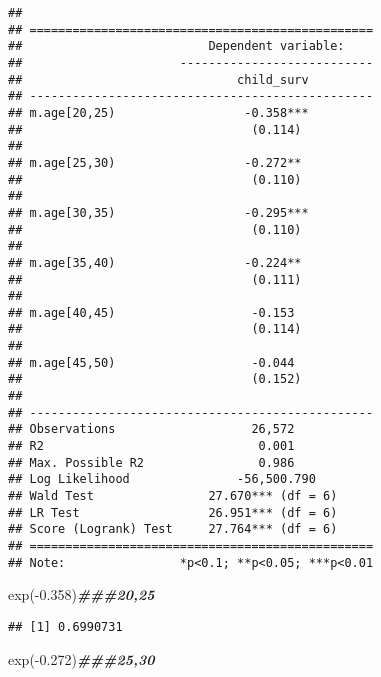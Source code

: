 \documentclass[
]{article}
\newenvironment{Shaded}{\begin{snugshade}}{\end{snugshade}}
\newcommand{\DocumentationTok}[1]{\textcolor[rgb]{0.56,0.35,0.01}{\textbf{\textit{#1}}}}
\newcommand{\FloatTok}[1]{\textcolor[rgb]{0.00,0.00,0.81}{#1}}
\newcommand{\FunctionTok}[1]{\textcolor[rgb]{0.00,0.00,0.00}{#1}}
\newcommand{\NormalTok}[1]{#1}
\newcommand{\SpecialCharTok}[1]{\textcolor[rgb]{0.00,0.00,0.00}{#1}}
\begin{document}
\begin{verbatim}
## 
## ================================================
##                          Dependent variable:    
##                      ---------------------------
##                              child_surv         
## ------------------------------------------------
## m.age[20,25)                  -0.358***         
##                                (0.114)          
##                                                 
## m.age[25,30)                  -0.272**          
##                                (0.110)          
##                                                 
## m.age[30,35)                  -0.295***         
##                                (0.110)          
##                                                 
## m.age[35,40)                  -0.224**          
##                                (0.111)          
##                                                 
## m.age[40,45)                   -0.153           
##                                (0.114)          
##                                                 
## m.age[45,50)                   -0.044           
##                                (0.152)          
##                                                 
## ------------------------------------------------
## Observations                   26,572           
## R2                              0.001           
## Max. Possible R2                0.986           
## Log Likelihood               -56,500.790        
## Wald Test                27.670*** (df = 6)     
## LR Test                  26.951*** (df = 6)     
## Score (Logrank) Test     27.764*** (df = 6)     
## ================================================
## Note:                *p<0.1; **p<0.05; ***p<0.01
\end{verbatim}

\begin{Shaded}
\begin{Highlighting}[]
\FunctionTok{exp}\NormalTok{(}\SpecialCharTok{{-}}\FloatTok{0.358}\NormalTok{)}\DocumentationTok{\#\#\#20,25   }
\end{Highlighting}
\end{Shaded}

\begin{verbatim}
## [1] 0.6990731
\end{verbatim}

\begin{Shaded}
\begin{Highlighting}[]
\FunctionTok{exp}\NormalTok{(}\SpecialCharTok{{-}}\FloatTok{0.272}\NormalTok{)}\DocumentationTok{\#\#\#25,30  }
\end{Highlighting}
\end{Shaded}
\end{document}
